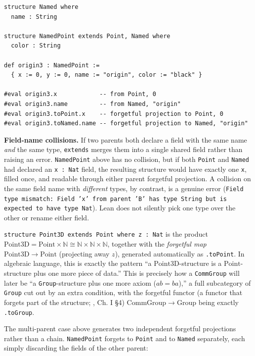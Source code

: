 \begin{lstlisting}
structure Named where
  name : String

structure NamedPoint extends Point, Named where
  color : String

def origin3 : NamedPoint :=
  { x := 0, y := 0, name := "origin", color := "black" }

#eval origin3.x            -- from Point, 0
#eval origin3.name         -- from Named, "origin"
#eval origin3.toPoint.x    -- forgetful projection to Point, 0
#eval origin3.toNamed.name -- forgetful projection to Named, "origin"
\end{lstlisting}

\textbf{Field-name collisions.} If two parents both declare a field with the same name \emph{and} the same type, \texttt{extends} merges them into a single shared field rather than raising an error. \texttt{NamedPoint} above has no collision, but if both \texttt{Point} and \texttt{Named} had declared an \texttt{x : Nat} field, the resulting structure would have exactly one \texttt{x}, filled once, and readable through either parent forgetful projection. A collision on the same field name with \emph{different} types, by contrast, is a genuine error (\texttt{Field type mismatch: Field 'x' from parent 'B' has type String but is expected to have type Nat}). Lean does not silently pick one type over the other or rename either field.

\begin{mathreading}

\texttt{structure Point3D extends Point where z : Nat} is the product \(\mathrm{Point3D} = \mathrm{Point} \times \mathbb{N} \cong
\mathbb{N} \times \mathbb{N} \times \mathbb{N}\), together with the \emph{forgetful map} \(\mathrm{Point3D} \to \mathrm{Point}\) (projecting away \(z\)), generated automatically as \texttt{.toPoint}. In algebraic language, this is exactly the pattern ``a \(\mathrm{Point3D}\)-structure is a \(\mathrm{Point}\)-structure plus one more piece of data.'' This is precisely how a \texttt{CommGroup} will later be ``a \texttt{Group}-structure plus one more axiom (\(ab = ba\)),'' a full subcategory of \texttt{Group} cut out by an extra condition, with the forgetful functor (a functor that forgets part of the structure; \cite{MacLane1998}, Ch. I §4) \(\mathrm{CommGroup} \to \mathrm{Group}\) being exactly \texttt{.toGroup}.

\end{mathreading}

The multi-parent case above generates two independent forgetful projections rather than a chain. \texttt{NamedPoint} forgets to \texttt{Point} and to \texttt{Named} separately, each simply discarding the fields of the other parent:

